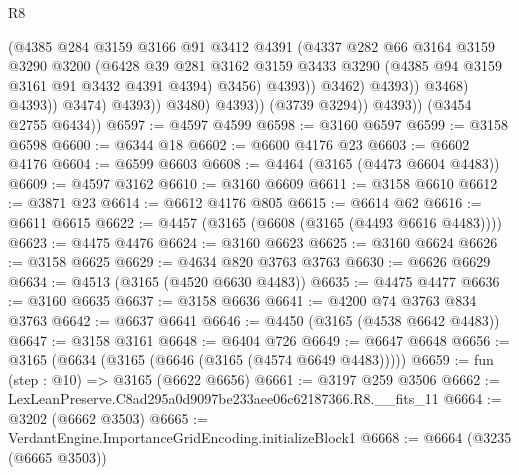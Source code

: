 \begin{lexlean}{R8}
\begin{coremodule}
                                    (@4385
                                      @284
                                      @3159
                                      @3166
                                      @91
                                      @3412
                                      @4391
                                      (@4337
                                        @282
                                        @66
                                        @3164
                                        @3159
                                        @3290
                                        @3200
                                        (@6428
                                          @39
                                          @281
                                          @3162
                                          @3159
                                          @3433
                                          @3290
                                          (@4385 @94 @3159 @3161 @91 @3432 @4391 @4394)
                                          @3456)
                                        @4393))
                                    @3462)
                                  @4393))
                              @3468)
                            @4393))
                        @3474)
                      @4393))
                  @3480)
                @4393))
            (@3739 @3294))
          @4393))
      (@3454 @2755 @6434))
@6597 := @4597 @4599
@6598 := @3160 @6597
@6599 := @3158 @6598
@6600 := @6344 @18
@6602 := @6600 @4176 @23
@6603 := @6602 @4176
@6604 := @6599 @6603
@6608 := @4464 (@3165 (@4473 @6604 @4483))
@6609 := @4597 @3162
@6610 := @3160 @6609
@6611 := @3158 @6610
@6612 := @3871 @23
@6614 := @6612 @4176 @805
@6615 := @6614 @62
@6616 := @6611 @6615
@6622 := @4457 (@3165 (@6608 (@3165 (@4493 @6616 @4483))))
@6623 := @4475 @4476
@6624 := @3160 @6623
@6625 := @3160 @6624
@6626 := @3158 @6625
@6629 := @4634 @820 @3763 @3763
@6630 := @6626 @6629
@6634 := @4513 (@3165 (@4520 @6630 @4483))
@6635 := @4475 @4477
@6636 := @3160 @6635
@6637 := @3158 @6636
@6641 := @4200 @74 @3763 @834 @3763
@6642 := @6637 @6641
@6646 := @4450 (@3165 (@4538 @6642 @4483))
@6647 := @3158 @3161
@6648 := @6404 @726
@6649 := @6647 @6648
@6656 := @3165 (@6634 (@3165 (@6646 (@3165 (@4574 @6649 @4483)))))
@6659 := fun (step : @10) => @3165 (@6622 @6656)
@6661 := @3197 @259 @3506
@6662 := LexLeanPreserve.C8ad295a0d9097be233aee06c62187366.R8.__fits_11
@6664 := @3202 (@6662 @3503)
@6665 := VerdantEngine.ImportanceGridEncoding.initializeBlock1
@6668 := @6664 (@3235 (@6665 @3503))

\end{coremodule}
\end{lexlean}
